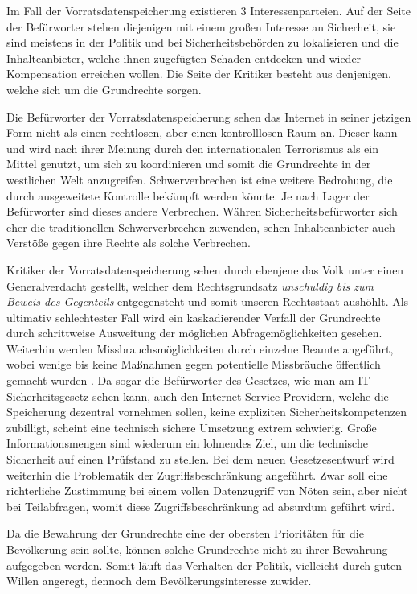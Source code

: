 \documentclass[
	12pt,
	a4paper,
	BCOR10mm,
	DIV14,
	listof=totoc,
	bibliography=totoc,
	headsepline
]{scrreprt}
\begin{document}
Im Fall der Vorratsdatenspeicherung existieren 3 Interessenparteien.
Auf der Seite der Befürworter stehen diejenigen mit einem großen Interesse an Sicherheit, sie sind meistens in der Politik und bei Sicherheitsbehörden zu lokalisieren und die Inhalteanbieter, welche ihnen zugefügten Schaden entdecken und wieder Kompensation erreichen wollen.
Die Seite der Kritiker besteht aus denjenigen, welche sich um die Grundrechte sorgen.

Die Befürworter der Vorratsdatenspeicherung sehen das Internet in seiner jetzigen Form nicht als einen rechtlosen, aber einen kontrolllosen Raum an.
Dieser kann und wird nach ihrer Meinung durch den internationalen Terrorismus als ein Mittel genutzt, um sich zu koordinieren und somit die Grundrechte in der westlichen Welt anzugreifen.
Schwerverbrechen ist eine weitere Bedrohung, die durch ausgeweitete Kontrolle bekämpft werden könnte.
Je nach Lager der Befürworter sind dieses andere Verbrechen.
Währen Sicherheitsbefürworter sich eher die traditionellen Schwerverbrechen zuwenden, sehen Inhalteanbieter auch Verstöße gegen ihre Rechte als solche Verbrechen.

Kritiker der Vorratsdatenspeicherung sehen durch ebenjene das Volk unter einen Generalverdacht gestellt, welcher dem Rechtsgrundsatz \textit{unschuldig bis zum Beweis des Gegenteils} entgegensteht und somit unseren Rechtsstaat aushöhlt.
Als ultimativ schlechtester Fall wird ein kaskadierender Verfall der Grundrechte durch schrittweise Ausweitung der möglichen Abfragemöglichkeiten gesehen.
Weiterhin werden Missbrauchsmöglichkeiten durch einzelne Beamte angeführt, wobei wenige bis keine Maßnahmen gegen potentielle Missbräuche öffentlich gemacht wurden \cite{ct:vorratsdaten}.
Da sogar die Befürworter des Gesetzes, wie man am IT-Sicherheitsgesetz sehen kann, auch den Internet Service Providern, welche die Speicherung dezentral vornehmen sollen, keine expliziten Sicherheitskompetenzen zubilligt, scheint eine technisch sichere Umsetzung extrem schwierig.
Große Informationsmengen sind wiederum ein lohnendes Ziel, um die technische Sicherheit auf einen Prüfstand zu stellen.
Bei dem neuen Gesetzesentwurf wird weiterhin die Problematik der Zugriffsbeschränkung angeführt.
Zwar soll eine richterliche Zustimmung bei einem vollen Datenzugriff von Nöten sein, aber nicht bei Teilabfragen, womit diese Zugriffsbeschränkung ad absurdum geführt wird.

Da die Bewahrung der Grundrechte eine der obersten Prioritäten für die Bevölkerung sein sollte, können solche Grundrechte nicht zu ihrer Bewahrung aufgegeben werden.
Somit läuft das Verhalten der Politik, vielleicht durch guten Willen angeregt, dennoch dem Bevölkerungsinteresse zuwider.
\end{document}

